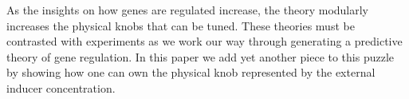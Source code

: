 As the insights on how genes are regulated increase, the theory modularly
increases the physical knobs that can be tuned. These theories must be
contrasted with experiments as we work our way through generating a predictive
theory of gene regulation. In this paper we add yet another piece to this puzzle
by showing how one can own the physical knob represented by the external inducer
concentration.
